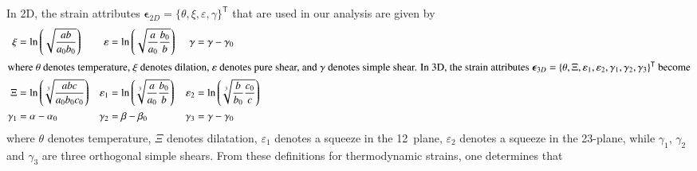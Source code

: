 In 2D, the strain attributes $\boldsymbol{\epsilon}_{2D}  = \{ \theta , \xi , \varepsilon , \gamma \}^{\mathsf{T}}$ that are used in our analysis are given by
\begin{subequations}
    \label{thermodynamicStrains}
    \begin{align}
    \xi & = \ln \left( \sqrt{\frac{ab}{a_0 b_0}} \right) &
    \varepsilon & = \ln \left( \sqrt{ \frac{a}{a_0} \frac{b_0}{b} } \right) &
    \gamma & = \gamma - \gamma_0 \\
    \intertext{where $\theta$ denotes temperature, $\xi$ denotes dilation, $\varepsilon$ denotes pure shear, and $\gamma$ denotes simple shear.  In 3D, the strain attributes $\boldsymbol{\epsilon}_{3D} = \{ \theta , \Xi , \varepsilon_1 , \varepsilon_2 , \gamma_1 , \gamma_2 , \gamma_3  \}^{\mathsf{T}}$ become}
    \Xi & = \ln \left( \sqrt[3]{\frac{abc}{a_0 b_0 c_0}} \right) &
    \varepsilon_1 & = \ln \left( \sqrt[3]{\frac{a}{a_0} \frac{b_0}{b}} \right) &
    \varepsilon_2 & = \ln \left( \sqrt[3]{\frac{b}{b_0} \frac{c_0}{c}} \right) \notag \\
    \gamma_1 & = \alpha - \alpha_0 &
    \gamma_2 & = \beta - \beta_0 &
    \gamma_3 & = \gamma - \gamma_0
    \end{align}
\end{subequations}
where $\theta$ denotes temperature, $\Xi$ denotes dilatation, $\varepsilon_1$ denotes a squeeze in the 12~plane, $\varepsilon_2$ denotes a squeeze in the 23-plane, while $\gamma_1$, $\gamma_2$ and $\gamma_3$ are three orthogonal simple shears.  From these definitions for thermo\-dynamic strains, one determines that
